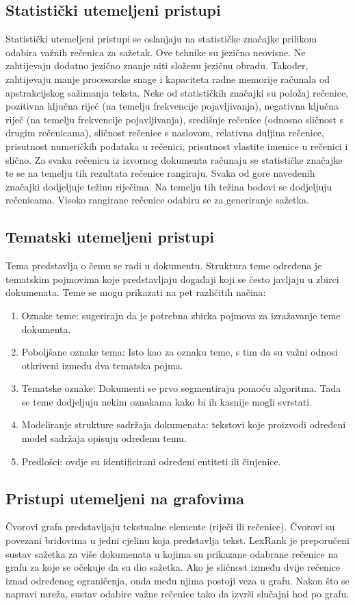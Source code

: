 \documentclass[times, utf8, zavrsni, numeric]{fer}
\begin{document}
\subsection{Statistički utemeljeni pristupi}
Statistički utemeljeni pristupi se oslanjaju na statističke značajke prilikom odabira važnih rečenica za sažetak.
Ove tehnike su jezično neovisne. Ne zahtijevaju dodatno jezično znanje niti složenu jezičnu obradu.
Također, zahtijevaju manje procesorske snage i kapaciteta radne memorije računala od apstrakcijskog sažimanja teksta.
Neke od statističkih značajki su položaj rečenice, pozitivna ključna riječ (na temelju frekvencije pojavljivanja), negativna ključna riječ (na temelju frekvencije pojavljivanja), središnje rečenice (odnosno sličnost s drugim rečenicama), sličnost rečenice s naslovom, relativna duljina rečenice, prisutnost numeričkih podataka u rečenici, prisutnost vlastite imenice u rečenici i slično.
Za svaku rečenicu iz izvornog dokumenta računaju se statističke značajke te se na temelju tih rezultata rečenice rangiraju.
Svaka od gore navedenih značajki dodjeljuje težinu riječima. Na temelju tih težina bodovi se dodjeljuju rečenicama.
Visoko rangirane rečenice odabiru se za generiranje sažetka.
\subsection{Tematski utemeljeni pristupi}
Tema predstavlja o čemu se radi u dokumentu. 
Struktura teme određena je tematskim pojmovima koje predstavljaju događaji koji se često javljaju u zbirci dokumenata.
Teme se mogu prikazati na pet različitih načina:
\begin{enumerate}
  \item Oznake teme: sugeriraju da je potrebna zbirka pojmova za izražavanje teme dokumenta.
  \item Poboljšane oznake tema: Isto kao za oznaku teme, s tim da su važni odnosi otkriveni između dva tematska pojma.
  \item Tematske oznake: Dokumenti se prvo segmentiraju pomoću algoritma. Tada se teme dodjeljuju nekim oznakama kako bi ih kasnije mogli svrstati.
  \item Modeliranje strukture sadržaja dokumenata: tekstovi koje proizvodi određeni model sadržaja opisuju određenu temu.
  \item Predlošci: ovdje su identificirani određeni entiteti ili činjenice.
\end{enumerate}
\subsection{Pristupi utemeljeni na grafovima}
Čvorovi grafa predstavljaju tekstualne elemente (riječi ili rečenice). Čvorovi su povezani bridovima u jedni cjelinu koja predstavlja tekst.
LexRank je preporučeni sustav sažetka za više dokumenata u kojima su prikazane odabrane rečenice na grafu za koje se očekuje da su dio sažetka.
Ako je sličnost između dvije rečenice iznad određenog ograničenja, onda među njima postoji veza u grafu.
Nakon što se napravi mreža, sustav odabire važne rečenice tako da izvrši slučajni hod po grafu.
\end{document}
